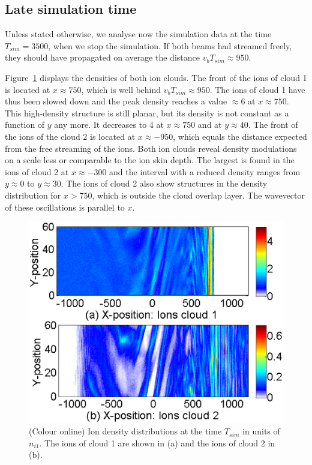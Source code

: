 \documentclass[structabstract]{aa}
\begin{document}
\subsection{Late simulation time}

Unless stated otherwise, we analyse now the simulation data at the time 
$T_{sim}=3500$, when we stop the simulation. If both beams had streamed 
freely, they should have propagated on average the distance $v_b T_{sim} 
\approx 950$.
 
Figure~\ref{Fig9} displays the densities of both ion clouds.
The front of the ions of cloud 1 is located at $x \approx 750$, which is
well behind $v_b T_{sim} \approx 950$. The ions of cloud 1 have thus been
slowed down and the peak density reaches a value $\approx 6$ at $x\approx 750$. 
This high-density structure is still planar, but its density is not 
constant as a function of $y$ any more. It decreases to $4$ at 
$x \approx 750$ and at $y \approx 40$. The front of the ions of 
the cloud 2 is located at $x \approx -950$, which equals the distance 
expected from the free streaming of the ions. Both ion clouds reveal 
density modulations on a scale less or comparable to the ion skin depth. 
The largest is found in the ions of cloud 2 at $x\approx -300$ and the 
interval with a reduced density ranges from $y \approx 0$ to $y\approx 30$. 
The ions of cloud 2 also show structures in the density distribution for 
$x > 750$, which is outside the cloud overlap layer. The wavevector of 
these oscillations is parallel to $x$.

\begin{figure}
\centering
\includegraphics[width=\columnwidth]{Fig9.eps}
\caption{(Colour online) Ion density distributions at the time $T_{sim}$ 
in units of $n_{i1}$. The ions of cloud 1 are shown in (a) and the ions 
of cloud 2 in (b).}\label{Fig9}
\end{figure}
\end{document}
